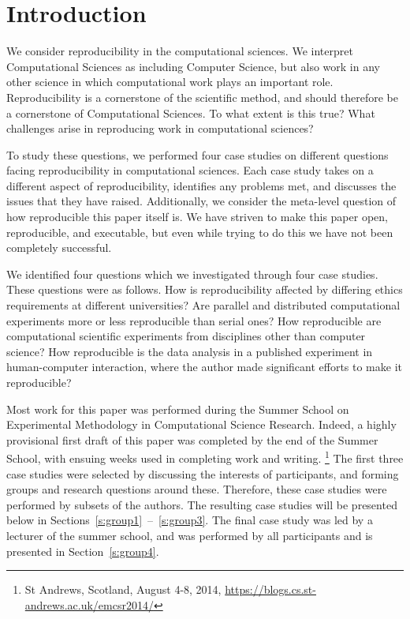 \section{Introduction}
\label{s:intro}


We consider reproducibility in the computational sciences.  We interpret Computational Sciences as including Computer Science, but also 
work in any other science in which computational work plays an important role.
Reproducibility is a cornerstone of the scientific method, and should therefore be a cornerstone of Computational Sciences.  
To what extent is this true?  What challenges arise in reproducing work in computational sciences?  

To study these questions, we performed four case studies on different questions facing reproducibility in computational sciences.  
Each case study takes on a different aspect of reproducibility, identifies any problems met, and discusses the issues that they have raised.
Additionally, we consider the meta-level question of how reproducible this paper itself is.  We have striven to make this paper open, 
reproducible, and executable, but even while trying to do this we have not been completely successful.

We identified four questions which we investigated through four case studies.  
These questions were as follows. 
How is reproducibility affected by differing ethics requirements at different universities? 
Are parallel and distributed computational experiments more or less reproducible than serial ones?
How reproducible are computational scientific experiments from disciplines other than computer science?
How reproducible is the data analysis in a published experiment in human-computer interaction, where 
the author made significant efforts to make it reproducible?

Most work for this paper was performed 
during the Summer School
on Experimental Methodology in Computational Science Research.   Indeed, a highly provisional first draft of this paper was completed by the end of the Summer School, with ensuing weeks used in completing work and writing.  
\footnote{St Andrews, Scotland, August 4-8, 2014,
\url{https://blogs.cs.st-andrews.ac.uk/emcsr2014/}} 
The first three case studies were selected by discussing the interests of participants, and forming groups and research questions around these. 
Therefore, these case studies were performed by subsets of the authors. 
The resulting case studies will be presented below
in Sections~\ref{s:group1}~--~\ref{s:group3}.
The final case study was led by a lecturer of the summer school, and was performed by all participants
and is presented in Section~\ref{s:group4}.


